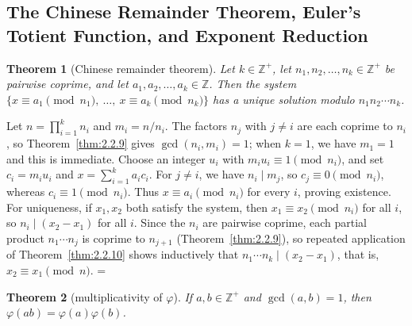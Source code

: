 \documentclass[11pt]{article}
\makeatletter
\theoremstyle{ntstyle}
\newtheorem{theorem}{Theorem}[subsection]
\let\nt@closedisplay\]
\def\nt@guardedclose{\@ifnextchar\par{\nt@closeafterpar}{\@ifnextchar\end{\postdisplaypenalty\@M\nt@closedisplay}{\nt@closedisplay}}}
\def\nt@closeafterpar\par{\@ifnextchar\par{\nt@closeafterpar}{\@ifnextchar\end{\postdisplaypenalty\@M\nt@closedisplay\par}{\nt@closedisplay\par}}}
\renewenvironment{proof}[1][\proofname]{\par
  \pushQED{\qed}\normalfont\topsep\medskipamount\edef\nt@afterproof{\@endparpenalty=\the\@endparpenalty\relax}\@beginparpenalty\@M\@endparpenalty\@M\let\]\nt@guardedclose\trivlist\item[]\textit{#1\@addpunct{.}} \ignorespaces}{\ifvmode\addpenalty\@M\fi\popQED\nt@afterproof\endtrivlist\@endpefalse}
\makeatother
\begin{document}
\subsection{The Chinese Remainder Theorem, Euler's Totient Function, and Exponent Reduction}

\begin{theorem}[Chinese remainder theorem]\label{thm:3.4.1} Let
	$k\in\mathbb{Z}^+$, let $n_1, n_2, \ldots, n_k \in \mathbb{Z}^+$ be
	pairwise coprime, and let $a_1, a_2, \ldots, a_k \in \mathbb{Z}$. Then
	the system $\{x \equiv a_1 \pmod{n_1},\ \ldots,\ x \equiv a_k \pmod{n_k}\}$ has
	a unique solution modulo $n_1 n_2 \cdots n_k$.
\end{theorem}

\begin{proof} Let $n = \prod_{i=1}^{k} n_i$ and $m_i=n/n_i$.
	The factors $n_j$ with $j\neq i$ are each coprime to $n_i$, so
	Theorem~\ref{thm:2.2.9} gives $\gcd(n_i,m_i)=1$; when $k=1$,
	we have $m_1=1$ and this is immediate. Choose an integer $u_i$ with
	$m_i u_i\equiv1\pmod{n_i}$, and set $c_i=m_i u_i$ and
	$x=\sum_{i=1}^{k}a_i c_i$. For $j\neq i$, we have $n_i\mid m_j$, so
	$c_j\equiv0\pmod{n_i}$, whereas $c_i\equiv1\pmod{n_i}$.
	Thus $x\equiv a_i\pmod{n_i}$ for every $i$, proving existence. For
	uniqueness, if $x_1, x_2$ both satisfy the system, then $x_1
		\equiv x_2 \pmod{n_i}$ for all $i$, so $n_i \mid (x_2 - x_1)$ for all
	$i$. Since the $n_i$ are pairwise coprime, each partial product
	$n_1\cdots n_j$ is coprime to $n_{j+1}$ (Theorem~\ref{thm:2.2.9}), so repeated application of
	Theorem~\ref{thm:2.2.10} shows inductively that $n_1\cdots n_k\mid(x_2-x_1)$, that is,
	$x_2 \equiv x_1 \pmod{n}$.
\end{proof}
\begin{theorem}[multiplicativity of $\varphi$]\label{thm:3.4.2} If $a, b \in \mathbb{Z}^+$
	and $\gcd(a, b) = 1$, then $\varphi(ab) = \varphi(a)\varphi(b)$.
\end{theorem}
\end{document}
